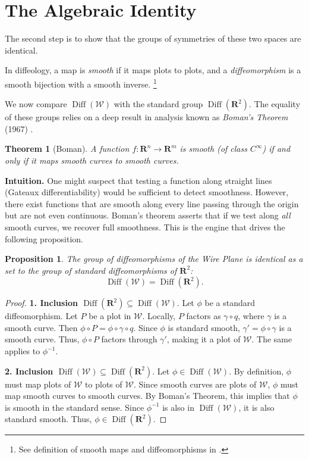 \documentclass[10pt,letterpaper,reqno]{amsart}
\newcommand{\RR}{\mathbf{R}}
\newcommand{\cW}{\mathcal{W}}
\DeclareMathOperator{\Diff}{Diff}
\newtheorem*{theorem*}{Theorem} %
\newtheorem*{proposition}{Proposition}
\begin{document}
  
  \section{The Algebraic Identity}
  
  The second step is to show that the groups of symmetries of these two spaces are identical.
  
  In diffeology,
  a map is \emph{smooth} if it maps plots to plots,
  and a \emph{diffeomorphism} is a smooth bijection with a smooth inverse.%
  \footnote{See definition of smooth maps and diffeomorphisms in \cite[ and 1.17]{PIZ13}.}
  
  We now compare $\Diff(\cW)$ with the standard group $\Diff(\RR^2)$.
  The equality of these groups relies on a deep result in analysis known as \emph{Boman's Theorem} (1967) \cite{Bom67}.
  
  \begin{theorem*}[Boman]
    A function $f: \RR^n \to \RR^m$ is smooth (of class $C^\infty$) if and only if it maps smooth curves to smooth curves.
  \end{theorem*}
  
  \textbf{Intuition.}
  One might suspect that testing a function along straight lines (Gateaux differentiability) would be sufficient to detect smoothness.
  However,
  there exist functions that are smooth along every line passing through the origin but are not even continuous.
  Boman's theorem asserts that if we test along \emph{all} smooth curves,
  we recover full smoothness.
  This is the engine that drives the following proposition.
  
  \begin{proposition}
    The group of diffeomorphisms of the Wire Plane is identical as a set to the group of standard diffeomorphisms of $\RR^2$:
    $$
      \Diff(\cW) = \Diff(\RR^2).
      $$
  \end{proposition}
  
  \begin{proof}
    \textbf{1. Inclusion $\Diff(\RR^2) \subseteq \Diff(\cW)$}.
    Let $\phi$ be a standard diffeomorphism.
    Let $P$ be a plot in $\cW$.
    Locally,
    $P$ factors as $\gamma \circ q$,
    where $\gamma$ is a smooth curve.
    Then $\phi \circ P = \phi \circ \gamma \circ q$.
    Since $\phi$ is standard smooth,
    $\gamma' = \phi \circ \gamma$ is a smooth curve.
    Thus,
    $\phi \circ P$ factors through $\gamma'$,
    making it a plot of $\cW$.
    The same applies to $\phi^{-1}$.
    
    \textbf{2. Inclusion $\Diff(\cW) \subseteq \Diff(\RR^2)$}.
    Let $\phi \in \Diff(\cW)$.
    By definition,
    $\phi$ must map plots of $\cW$ to plots of $\cW$.
    Since smooth curves are plots of $\cW$,
    $\phi$ must map smooth curves to smooth curves.
    By Boman's Theorem,
    this implies that $\phi$ is smooth in the standard sense.
    Since $\phi^{-1}$ is also in $\Diff(\cW)$,
    it is also standard smooth.
    Thus,
    $\phi \in \Diff(\RR^2)$.
  \end{proof}
  
\end{document}
